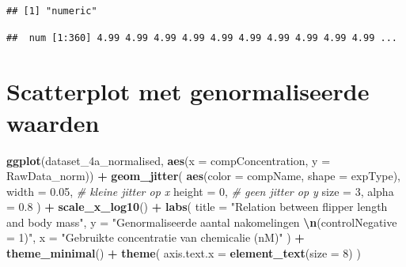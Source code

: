 \documentclass[
]{book}
\newenvironment{Shaded}{\begin{snugshade}}{\end{snugshade}}
\newcommand{\AttributeTok}[1]{\textcolor[rgb]{0.13,0.29,0.53}{#1}}
\newcommand{\CommentTok}[1]{\textcolor[rgb]{0.56,0.35,0.01}{\textit{#1}}}
\newcommand{\DecValTok}[1]{\textcolor[rgb]{0.00,0.00,0.81}{#1}}
\newcommand{\FloatTok}[1]{\textcolor[rgb]{0.00,0.00,0.81}{#1}}
\newcommand{\FunctionTok}[1]{\textcolor[rgb]{0.13,0.29,0.53}{\textbf{#1}}}
\newcommand{\NormalTok}[1]{#1}
\newcommand{\OtherTok}[1]{\textcolor[rgb]{0.56,0.35,0.01}{#1}}
\newcommand{\SpecialCharTok}[1]{\textcolor[rgb]{0.81,0.36,0.00}{\textbf{#1}}}
\newcommand{\StringTok}[1]{\textcolor[rgb]{0.31,0.60,0.02}{#1}}
\begin{document}
\begin{verbatim}
## [1] "numeric"
\end{verbatim}

\begin{Shaded}
\end{Shaded}

\begin{verbatim}
##  num [1:360] 4.99 4.99 4.99 4.99 4.99 4.99 4.99 4.99 4.99 4.99 ...
\end{verbatim}

\section{Scatterplot met genormaliseerde waarden}\label{scatterplot-met-genormaliseerde-waarden}

\begin{Shaded}
\begin{Highlighting}[]
\FunctionTok{ggplot}\NormalTok{(dataset\_4a\_normalised, }\FunctionTok{aes}\NormalTok{(}\AttributeTok{x =}\NormalTok{ compConcentration, }\AttributeTok{y =}\NormalTok{ RawData\_norm)) }\SpecialCharTok{+}
  \FunctionTok{geom\_jitter}\NormalTok{(}
    \FunctionTok{aes}\NormalTok{(}\AttributeTok{color =}\NormalTok{ compName, }\AttributeTok{shape =}\NormalTok{ expType),}
    \AttributeTok{width =} \FloatTok{0.05}\NormalTok{, }\CommentTok{\# kleine jitter op x}
    \AttributeTok{height =} \DecValTok{0}\NormalTok{, }\CommentTok{\# geen jitter op y}
    \AttributeTok{size =} \DecValTok{3}\NormalTok{,}
    \AttributeTok{alpha =} \FloatTok{0.8}
\NormalTok{  ) }\SpecialCharTok{+}
  \FunctionTok{scale\_x\_log10}\NormalTok{() }\SpecialCharTok{+}
  \FunctionTok{labs}\NormalTok{(}
    \AttributeTok{title =} \StringTok{"Relation between flipper length and body mass"}\NormalTok{,}
    \AttributeTok{y =} \StringTok{"Genormaliseerde aantal nakomelingen }\SpecialCharTok{\textbackslash{}n}\StringTok{(controlNegative = 1)"}\NormalTok{,}
    \AttributeTok{x =} \StringTok{"Gebruikte concentratie van chemicalie (nM)"}
\NormalTok{  ) }\SpecialCharTok{+}
  \FunctionTok{theme\_minimal}\NormalTok{() }\SpecialCharTok{+}
  \FunctionTok{theme}\NormalTok{(}
    \AttributeTok{axis.text.x =} \FunctionTok{element\_text}\NormalTok{(}\AttributeTok{size =} \DecValTok{8}\NormalTok{)}
\NormalTok{  )}
\end{Highlighting}
\end{Shaded}
\end{document}
